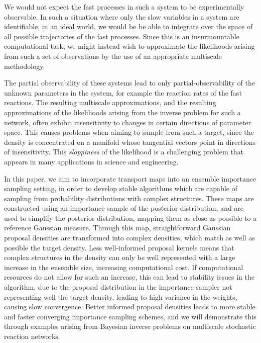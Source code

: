 \documentclass[final]{siamltex}
\begin{document}
We would not expect the fast processes in such a system to be
experimentally observable. In such a situation where only the slow
variables in a system are identifiable, in an ideal world, we would be
be able to integrate over the space of all possible trajectories of
the fast processes. Since this is an insurmountable computational
task, we might instead wish to approximate the likelihoods arising
from such a set of observations by the use of an appropriate
multiscale methodology.

The partial observability of these systems lead to only
partial-observability of the unknown parameters in the system, for
example the reaction rates of the fast reactions. The resulting
multiscale approximations, and the resulting approximations of the
likelihoods arising from the inverse problem for such a network, 
often exhibit 
insensitivity to changes in certain directions of
parameter space. This causes problems when aiming to sample from such
a target, since the density is concentrated on a manifold whose
tangential vectors point in directions of insensitivity. This
\emph{sloppiness}\cite{gutenkunst2007universally,apgar2010sloppy} of the likelihood is a challenging problem
that appears in many applications in science and engineering\cite{constantine2014active}.

In this paper, we aim to incorporate transport maps into an ensemble
importance sampling setting, in order to develop stable algorithms which are
capable of sampling from probability distributions with complex
structures. These maps are constructed using an importance sample of
the posterior distribution, and are used to simplify the posterior
distribution, mapping them as close as possible to a reference
Gaussian measure. Through this map, straightforward Gaussian proposal
densities are transformed into complex densities, which match as well
as possible the target density. Less well-informed proposal kernels means that complex
structures in the density can only be well represented with a large
increase in the ensemble size, increasing computational cost. If
computational resources do not allow for such an increase, this can
lead to stability issues in the algorithm, due to the proposal
distribution in the importance sampler not representing well the
target density, leading to high variance in the weights, causing slow
convergence. Better informed proposal densities
leads to more stable and faster converging importance sampling
schemes, and we will demonstrate this through examples
arising from Bayesian inverse problems on multiscale stochastic
reaction networks.
\end{document}
